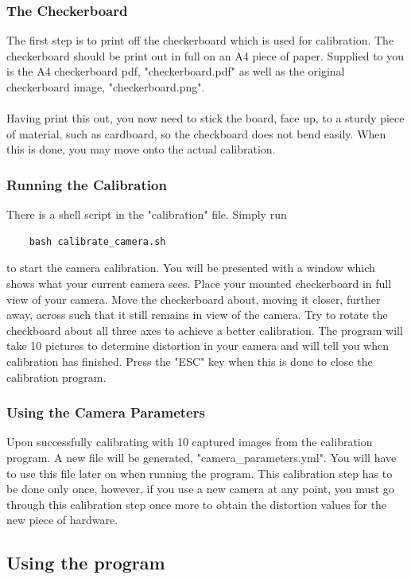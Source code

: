 \documentclass[11pt]{article}
\begin{document}
\subsubsection*{The Checkerboard}
The first step is to print off the checkerboard which is used for 
calibration. The checkerboard should be print out in full  on an
A4 piece of paper. Supplied to you is the A4 checkerboard pdf,
"checkerboard.pdf" as well as the original checkerboard image,
"checkerboard.png".\\
\\
Having print this out, you now need to stick the board, face up, to 
a sturdy piece of material, such as cardboard, so the checkboard
does not bend easily. When this is done, you may move onto the 
actual calibration.

\subsubsection*{Running the Calibration}
There is a shell script in the "calibration" file. Simply run

\begin{verbatim}
	bash calibrate_camera.sh
\end{verbatim}


to start the camera calibration. You will be presented with a 
window which shows what your current camera sees. Place your 
mounted checkerboard in full view of your camera. Move the 
checkerboard about, moving it closer, further away, across such
that it still remains in view of the camera. Try to rotate
the checkboard about all three axes to achieve a better calibration.
The program will take 10 pictures to determine distortion in your 
camera and will tell you when calibration has finished. 
Press the "ESC" key when this is done to close the calibration program.

\subsubsection*{Using the Camera Parameters}
Upon successfully calibrating with 10 captured images from the 
calibration program. A new file will be generated, "camera\_parameters.yml".
You will have to use this file later on when running the program.
This calibration step has to be done only once, however, if you
use a new camera at any point, you must go through this calibration 
step once more to obtain the distortion values for the new piece of
hardware.

\subsection{Using the program}
\end{document}
